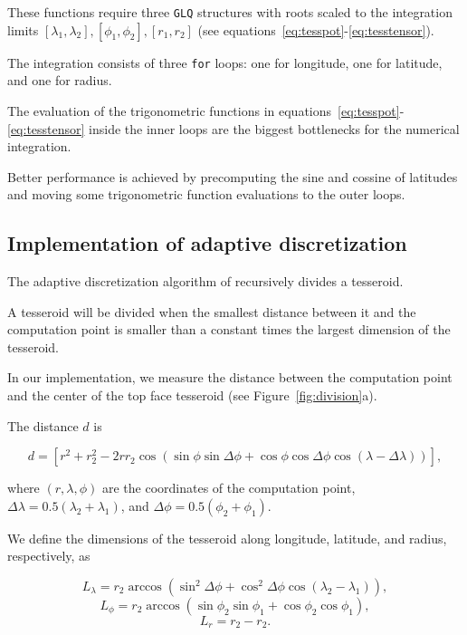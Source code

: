 \documentclass[paper,twocolumn]{geophysics}
\begin{document}
These functions require three \texttt{GLQ} structures with roots scaled to the
integration limits $[\lambda_1, \lambda_2], [\phi_1, \phi_2], [r_1, r_2]$
(see equations~\ref{eq:tesspot}-\ref{eq:tesstensor}).

The integration consists of three \texttt{for} loops: one for longitude, one
for latitude, and one for radius.

The evaluation of the trigonometric functions in
equations~\ref{eq:tesspot}-\ref{eq:tesstensor} inside the inner loops
are the biggest bottlenecks for the numerical integration.

Better performance is achieved by
precomputing the sine and cossine of latitudes
and moving some trigonometric function
evaluations to the outer loops.



\subsection{Implementation of adaptive discretization}


The adaptive discretization algorithm of \citet{Li2011} recursively
divides a tesseroid.

A tesseroid will be divided when the smallest distance between it and the
computation point is smaller than a constant times the largest dimension of the
tesseroid.

In our implementation,
we measure the distance between
the computation point
and the center of the top face tesseroid
(see Figure~\ref{fig:division}a).

The distance $d$ is

\begin{equation}
    d = \left[
        r^2 + r_2^2 - 2 r r_2
        \cos(\sin\phi\sin\Delta\phi + \cos\phi\cos\Delta\phi
            \cos(\lambda - \Delta\lambda))
        \right],
    \label{eq:distance}
\end{equation}

where
$(r, \lambda, \phi)$ are the coordinates of the computation point,
$\Delta\lambda = 0.5(\lambda_2 + \lambda_1)$,
and
$\Delta\phi = 0.5(\phi_2 + \phi_1)$.

We define the dimensions of the tesseroid
along longitude, latitude, and radius, respectively, as

\begin{equation}
    L_\lambda = r_2 \arccos(\sin^2\Delta\phi +
        \cos^2\Delta\phi\cos(\lambda_2 - \lambda_1)),
    \label{eq:sizelon}
\end{equation}
\begin{equation}
    L_\phi = r_2 \arccos(\sin\phi_2\sin\phi_1 + \cos\phi_2\cos\phi_1),
\end{equation}
\begin{equation}
    L_r = r_2 - r_2.
    \label{eq:sizer}
\end{equation}
\end{document}
